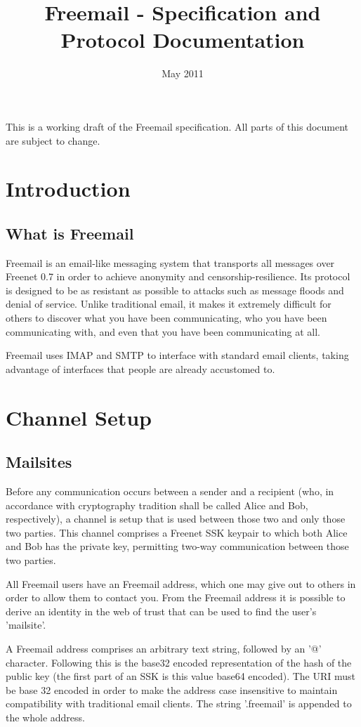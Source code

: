 \documentclass[12pt,a4paper]{article}
\begin{document}
\title{Freemail - Specification and Protocol Documentation}
\date{May 2011}
\maketitle

This is a working draft of the Freemail specification. All parts of this document are subject to
change.

\section{Introduction}
\subsection{What is Freemail}
Freemail is an email-like messaging system that transports all messages over Freenet 0.7 in order to
achieve anonymity and censorship-resilience. Its protocol is designed to be as resistant as possible
to attacks such as message floods and denial of service. Unlike traditional email, it makes it
extremely difficult for others to discover what you have been communicating, who you have been
communicating with, and even that you have been communicating at all.

Freemail uses IMAP and SMTP to interface with standard email clients, taking advantage of interfaces
that people are already accustomed to.

\section{Channel Setup}
\subsection{Mailsites}
Before any communication occurs between a sender and a recipient (who, in accordance with
cryptography tradition shall be called Alice and Bob, respectively), a channel is setup that is used
between those two and only those two parties. This channel comprises a Freenet SSK keypair to which
both Alice and Bob has the private key, permitting two-way communication between those two parties.

All Freemail users have an Freemail address, which one may give out to others in order to allow them
to contact you. From the Freemail address it is possible to derive an identity in the web of trust
that can be used to find the user's 'mailsite'.

A Freemail address comprises an arbitrary text string, followed by an '@' character. Following this
is the base32 encoded representation of the hash of the public key (the first part of an SSK is
this value base64 encoded). The URI must be base 32 encoded in order to make the address case
insensitive to maintain compatibility with traditional email clients. The string '.freemail' is
appended to the whole address.
\end{document}

